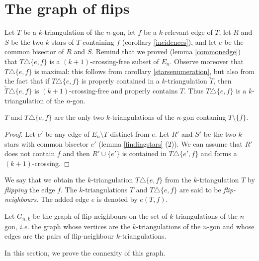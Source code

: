 \documentclass[12pt]{amsart}
\begin{document}


\section{The graph of flips}\label{sectionflips}

Let $T$ be a $k$-triangulation of the $n$-gon, let $f$ be a $k$-relevant edge of $T$, let $R$ and $S$ be the two $k$-stars of $T$ containing $f$ (corollary \ref{incidences}), and let $e$ be the common bisector of $R$ and $S$. Remind that we proved (lemma \ref{commonedge}) that $T\triangle\{e,f\}$ is a $(k+1)$-crossing-free subset of $E_n$. Observe moreover that $T\triangle\{e,f\}$ is maximal: this follows from corollary \ref{starsenumeration}, but also from the fact that if $T\triangle\{e,f\}$ is properly contained in a $k$-triangulation $\widetilde{T}$, then $\widetilde{T}\triangle\{e,f\}$ is $(k+1)$-crossing-free and properly contains $T$. Thus $T\triangle\{e,f\}$ is a $k$-triangulation of the $n$-gon.

\begin{lemma}\label{flip}
$T$ and $T\triangle\{e,f\}$ are the only two $k$-triangulations of the $n$-gon contaning $T\setminus\{f\}$.
\end{lemma}

\begin{proof}
Let $e'$ be any edge of $E_n\setminus T$ distinct from $e$. Let $R'$ and $S'$ be the two $k$-stars with common bisector $e'$ (lemma \ref{findingstars} (2)). We can assume that $R'$ does not contain $f$ and then $R'\cup\{e'\}$ is contained in $T\triangle\{e',f\}$ and forms a $(k+1)$-crossing.
\end{proof}

We say that we obtain the $k$-triangulation $T\triangle\{e,f\}$ from the $k$-triangulation $T$ by \emph{flipping} the edge $f$. The $k$-triangulations $T$ and $T\triangle\{e,f\}$ are said to be \emph{flip-neighbours}. The added edge $e$ is denoted by $e(T,f)$.

Let $G_{n,k}$ be the graph of flip-neighbours on the set of $k$-triangulations of the $n$-gon, {\it i.e.} the graph whose vertices are the $k$-triangulations of the $n$-gon and whose edges are the pairs of flip-neighbour $k$-triangulations.

In this section, we prove the connexity of this graph.
\end{document}
